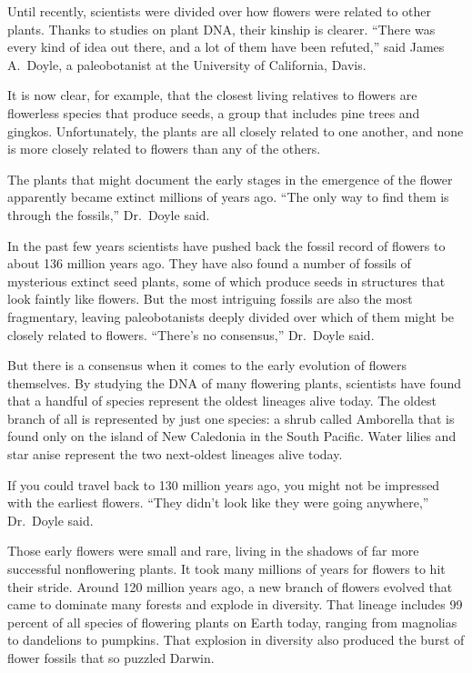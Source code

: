 ﻿\documentclass[12pt]{article}
\begin{document}
Until recently, scientists were divided over how flowers were related to other plants. Thanks to
studies on plant DNA, their kinship\cite{kinship} is clearer. ``There was every kind of idea out
there, and a lot of them have been refuted\cite{refute},'' said James A.~Doyle, a paleobotanist at
the University of California, Davis.

It is now clear, for example, that the closest living relatives to flowers are flowerless species
that produce seeds, a group that includes pine trees and gingkos. Unfortunately, the plants are all
closely related to one another, and none is more closely related to flowers than any of the others.

The plants that might document the early stages in the emergence of the flower apparently became
extinct millions of years ago. ``The only way to find them is through the fossils,'' Dr.~Doyle said.

In the past few years scientists have pushed back the fossil record of flowers to about 136 million
years ago. They have also found a number of fossils of mysterious extinct seed plants, some of which
produce seeds in structures that look faintly like flowers. But the most intriguing\cite{intrigue}
fossils are also the most fragmentary, leaving paleobotanists deeply divided over which of them
might be closely related to flowers. ``There's no consensus\cite{consensus},'' Dr.~Doyle said.

But there is a consensus when it comes to the early evolution of flowers themselves. By studying the
DNA of many flowering plants, scientists have found that a handful of species represent the oldest
lineages\cite{lineage} alive today. The oldest branch of all is represented by just one species: a
shrub called Amborella that is found only on the island of New Caledonia in the South Pacific. Water
lilies and star anise represent the two next-oldest lineages alive today.

If you could travel back to 130 million years ago, you might not be impressed with the earliest
flowers. ``They didn't look like they were going anywhere,'' Dr.~Doyle said.

Those early flowers were small and rare, living in the shadows of far more successful nonflowering
plants. It took many millions of years for flowers to hit their stride. Around 120 million years
ago, a new branch of flowers evolved that came to dominate many forests and explode in diversity.
That lineage includes 99 percent of all species of flowering plants on Earth today, ranging from
magnolias to dandelions to pumpkins. That explosion in diversity also produced the burst of flower
fossils that so puzzled Darwin.
\end{document}
